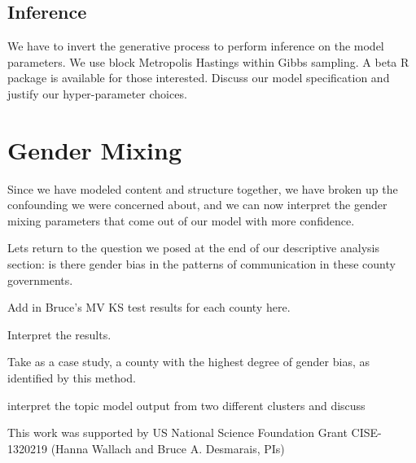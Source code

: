 \documentclass{pnastwo}
\begin{document}
\begin{article}
\subsection{Inference}
 We have to invert the generative process to perform inference on the model parameters.
We use block Metropolis Hastings within Gibbs sampling.
A beta R package is available for those interested.
Discuss our model specification and justify our hyper-parameter choices.


\section{Gender Mixing}



Since we have modeled content and structure together, we have broken up the confounding we were concerned about, and we can now interpret the gender mixing parameters that come out of our model with more confidence.
	
Lets return to the question we posed at the end of our descriptive analysis section: is there gender bias in the patterns of communication in these county governments. 
	
 Add in Bruce's MV KS test results for each county here.
	
Interpret the results.
	
	
Take as a case study, a county with the highest degree of gender bias, as identified by this method.
	
interpret the topic model output from two different clusters and discuss
	
	







\begin{acknowledgments}
This work was supported by US National Science Foundation Grant CISE-1320219 (Hanna Wallach and Bruce A. Desmarais, PIs)
\vspace{-.5cm}
\end{acknowledgments}




\end{article}
\end{document}
